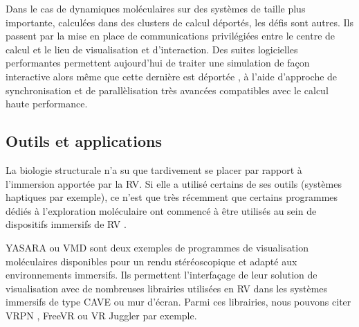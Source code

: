Dans le cas de dynamiques moléculaires sur des systèmes de taille plus importante, calculées dans des clusters de calcul déportés, les défis sont autres. Ils passent par la mise en place de communications privilégiées entre le centre de calcul et le lieu de visualisation et d'interaction. %
Des suites logicielles performantes permettent aujourd'hui de traiter une simulation de façon interactive alors même que cette dernière est déportée \cite{dreher2014exaviz}, à l'aide d'approche de  synchronisation et de parallèlisation très avancées compatibles avec le calcul haute performance. %


\subsection{Outils et applications}

La biologie structurale n'a su que tardivement se placer par rapport à l'immersion apportée par la RV. Si elle a utilisé certains de ses outils (systèmes haptiques par exemple), ce n'est que très récemment que certains programmes dédiés à l'exploration moléculaire ont commencé à être utilisés au sein de dispositifs immersifs de RV
\cite{odonoghue_visualization_2010}.


YASARA \cite{krieger2014yasara} ou VMD \cite{stone_immersive_2010} sont deux exemples de programmes de visualisation moléculaires disponibles pour un rendu stéréoscopique et adapté aux environnements immersifs. Ils permettent l'interfaçage de leur solution de visualisation avec de nombreuses librairies utilisées en RV dans les systèmes immersifs de type CAVE ou mur d'écran. Parmi ces librairies, nous pouvons citer VRPN \cite{taylor2001vrpn}, FreeVR \cite{pape2004commodity} ou VR Juggler par exemple.

